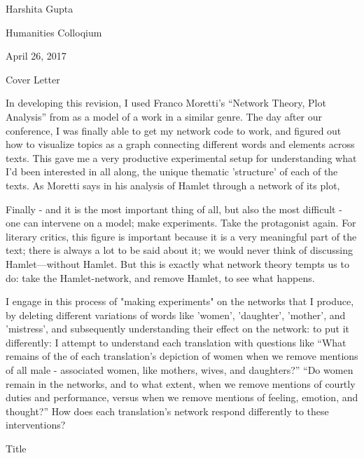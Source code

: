 \documentclass[12pt]{article}
\newenvironment{coverletter}{\begin{center} Cover Letter \end{center}}{\newpage }
\begin{document}
\begin{flushleft}


\begin{spacing}{2.0}
Harshita Gupta

Humanities Colloqium

April 26, 2017

\begin{coverletter}
\singlespacing
In developing this revision, I used Franco Moretti's ``Network Theory, Plot Analysis'' from  as a model of a work in a similar genre. The day after our conference, I was finally able to get my network code to work, and figured out how to visualize topics as a graph connecting different words and elements across texts. This gave me a very productive experimental setup for understanding what I'd been interested in all along, the unique thematic 'structure' of each of the texts. As Moretti says in his analysis of Hamlet through a network of its plot,

\begin{displayquote}
Finally - and it is the most important thing of all, but also the most difficult - one can intervene on a model; make experiments. Take the protagonist again. For literary critics, this figure is important because it is a very meaningful part of the text; there is always a lot to be said about it; we would never think of discussing Hamlet—without Hamlet. But this is exactly what network theory tempts us to do: take the Hamlet-network, and remove Hamlet, to see what happens.
\end{displayquote}

I engage in this process of "making experiments" on the networks that I produce, by deleting different variations of words like 'women', 'daughter', 'mother', and 'mistress', and subsequently understanding their effect on the network: to put it differently: I attempt to understand each translation with questions like ``What remains of the of each translation's depiction of women when we remove mentions of all male - associated women, like mothers, wives, and daughters?'' ``Do women remain in the networks, and to what extent, when we remove mentions of courtly duties and performance, versus when we remove mentions of feeling, emotion, and thought?'' How does each translation's network respond differently to these interventions?



\end{coverletter}


\begin{center}
Title
\end{center}


\end{spacing}
\end{flushleft}
\end{document}
